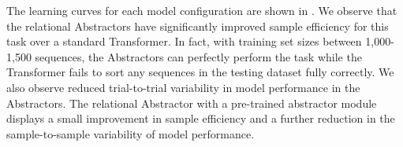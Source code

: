 The learning curves for each model configuration are shown in . We observe that the relational Abstractors have significantly improved sample efficiency for this task over a standard Transformer. In fact, with training set sizes between 1,000-1,500 sequences, the Abstractors can perfectly perform the task while the Transformer fails to sort any sequences in the testing dataset fully correctly. We also observe reduced trial-to-trial variability in model performance in the Abstractors. The relational Abstractor with a pre-trained abstractor module displays a small improvement in sample efficiency and a further reduction in the sample-to-sample variability of model performance.

